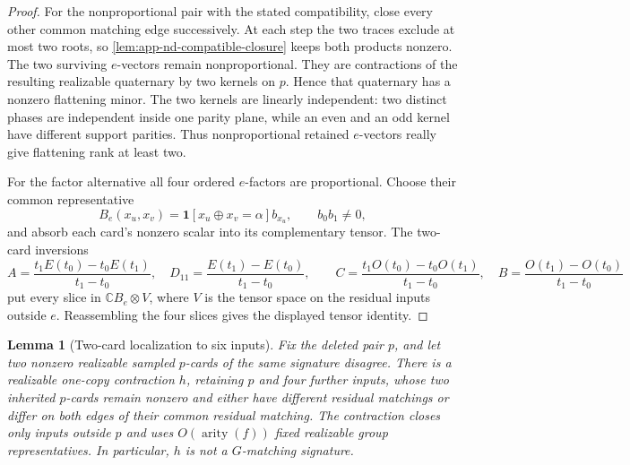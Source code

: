 \documentclass[11pt,letterpaper,onecolumn]{article}
\theoremstyle{plain}
\newtheorem{lemma}[lemma]{Lemma}
\theoremstyle{definition}
\theoremstyle{remark}
\newcommand{\arity}{\operatorname{arity}}
\newcommand{\one}{\mathbf 1}
\begin{document}
\begin{proof}
For the nonproportional pair with the stated compatibility, close every
other common matching edge successively.  At each step
the two traces exclude at most two roots, so
\cref{lem:app-nd-compatible-closure} keeps both products nonzero.  The two
surviving \(e\)-vectors remain nonproportional.  They are contractions of
the resulting realizable quaternary by two kernels on \(p\). Hence that quaternary has a
nonzero flattening minor.  The two kernels are linearly independent: two
distinct phases are independent inside one parity plane, while an even and
an odd kernel have different support parities.  Thus nonproportional
retained \(e\)-vectors really give flattening rank at least two.

For the factor alternative all four ordered \(e\)-factors are proportional. Choose their common representative
\[
 B_e(x_u,x_v)=\one[x_u\oplus x_v=\alpha]b_{x_u},
 \qquad b_0b_1\ne0,
\]
and absorb each card's nonzero scalar into its complementary tensor.  The
two-card inversions
\[
 A=\frac{t_1E(t_0)-t_0E(t_1)}{t_1-t_0},\quad
 D_{11}=\frac{E(t_1)-E(t_0)}{t_1-t_0},\qquad
 C=\frac{t_1O(t_0)-t_0O(t_1)}{t_1-t_0},\quad
 B=\frac{O(t_1)-O(t_0)}{t_1-t_0}
\]
put every slice in \(\mathbb C B_e\otimes V\), where \(V\) is the tensor
space on the residual inputs outside \(e\).  Reassembling the four
slices gives the displayed tensor identity.
\end{proof}

\begin{lemma}[Two-card localization to six inputs]
\label{lem:app-nd-localization}
Fix the deleted pair \(p\), and let two nonzero realizable sampled
\(p\)-cards of the same signature disagree.  There is a realizable
one-copy contraction \(h\), retaining \(p\) and four further inputs, whose
two inherited \(p\)-cards remain nonzero and either have different
residual matchings or differ on both edges of their common residual
matching.  The contraction closes only inputs outside \(p\) and uses
\(O(\arity(f))\) fixed realizable group representatives.  In particular,
\(h\) is not a \(G\)-matching signature.
\end{lemma}
\end{document}
